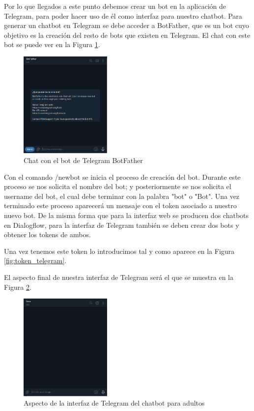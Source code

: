 Por lo que llegados a este punto debemos crear un bot en la aplicación de Telegram, para poder hacer uso de él como interfaz para nuestro chatbot. Para generar un chatbot en Telegram se debe acceder a BotFather, que es un bot cuyo objetivo es la creación del resto de bots que existen en Telegram. El chat con este bot se puede ver en la Figura \ref{fig:bot_father}.

\begin{figure}[h]
\centering
\includegraphics[width=0.4\textwidth]{imagenes/07_Implementacion/bot_father.png}
\caption{Chat con el bot de Telegram BotFather}
\label{fig:bot_father}
\end{figure}

Con el comando /newbot se inicia el proceso de creación del bot. Durante este proceso se nos solicita el nombre del bot; y posteriormente se nos solicita el username del bot, el cual debe terminar con la palabra "bot" o "Bot". Una vez terminado este proceso aparecerá un mensaje con el token asociado a nuestro nuevo bot. De la misma forma que para la interfaz web se producen dos chatbots en Dialogflow, para la interfaz de Telegram también se deben crear dos bots y obtener los tokens de ambos.

Una vez tenemos este token lo introducimos tal y como aparece en la Figura \ref{fig:token_telegram}.

El aspecto final de nuestra interfaz de Telegram será el que se muestra en la Figura \ref{fig:interfaz_telegram}.

\begin{figure}[h]
\centering
\includegraphics[width=0.4\textwidth]{imagenes/07_Implementacion/interfaz_telegram.png}
\caption{Aspecto de la interfaz de Telegram del chatbot para adultos}
\label{fig:interfaz_telegram}
\end{figure}


